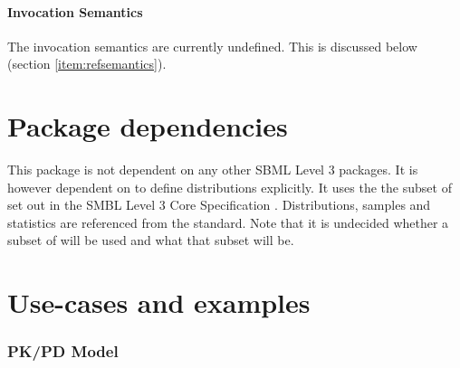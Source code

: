 \documentclass[draftspec]{sbmlpkgspec}
\begin{document}
\paragraph{Invocation Semantics}

The invocation semantics are currently undefined. This is discussed below
(section \vref{item:refsemantics}).

\section{Package dependencies}

This package is not dependent on any other SBML Level 3 packages. It
is however dependent on \mathml \cite{mathml2} to define distributions
explicitly. It uses the the subset of \mathml set out in the SMBL
Level 3 Core Specification \cite{l3v1c}. Distributions, samples and
statistics are referenced from the \uncertml standard. Note
\contraversial that it is undecided whether a subset of  \uncertml will
be used and what that subset will be.

\section{Use-cases and examples}

\subsubsection{PK/PD Model}
\end{document}
